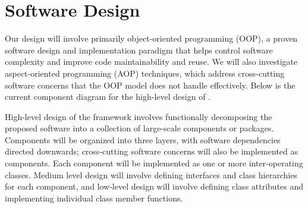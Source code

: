 \documentclass[11pt,letterpaper]{article}
\begin{document}
\section{Software Design} \label{s:design}


Our design will involve primarily object-oriented programming (OOP), a
proven software design and implementation paradigm that helps control
software complexity and improve code maintainability and reuse.  We
will also investigate aspect-oriented programming (AOP) techniques,
which address cross-cutting software concerns that the OOP model does
not handle effectively.  Below is the current component diagram for
the high-level design of \cello.



High-level design of the framework involves functionally decomposing
the proposed software into a collection of large-scale components or
packages.  Components will be organized into three layers, with
software dependencies directed downwards; cross-cutting software
concerns will also be implemented as components.  Each component will
be implemented as one or more inter-operating classes.  Medium level
design will involve defining interfaces and class hierarchies for each
component, and low-level design will involve defining class attributes
and implementing individual class member functions.

\end{document}

